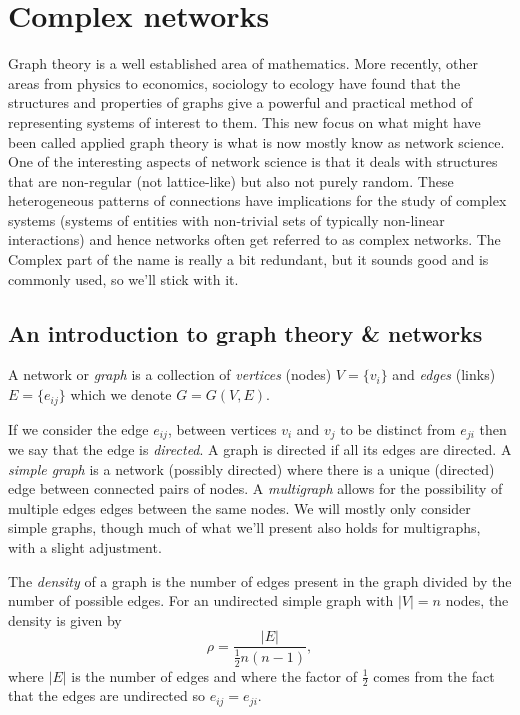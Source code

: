 \section{Complex networks}

Graph theory is a well established area of mathematics. More recently, other areas from physics to economics, sociology to ecology have found that the structures and properties of graphs give a powerful and practical method of representing systems of interest to them. This new focus on what might have been called applied graph theory is what is now mostly know as network science. One of the interesting aspects of network science is that it deals with structures that are non-regular (not lattice-like) but also not purely random. These heterogeneous patterns of connections have implications for the study of complex systems (systems of entities with non-trivial sets of typically non-linear interactions) and hence networks often get referred to as complex networks. The Complex part of the name is really a bit redundant, but it sounds good and is commonly used, so we'll stick with it.

\subsection{An introduction to graph theory \& networks}

A network or \emph{graph} is a collection of \emph{vertices} (nodes) $V=\{v_i\}$ and \emph{edges} (links) $E=\{e_{ij}\}$ which we denote $G= G(V,E)$.

If we consider the edge $e_{ij}$, between vertices $v_i$ and $v_j$ to be distinct from $e_{ji}$ then we say that the edge is \emph{directed}. A graph is directed if all its edges are directed. A \emph{simple graph} is a network (possibly directed) where there is a unique (directed) edge between connected pairs of nodes. A \emph{multigraph} allows for the possibility of multiple edges edges between the same nodes. We will mostly only consider simple graphs, though much of what we'll present also holds for multigraphs, with a slight adjustment. 

The \emph{density} of a graph is the number of edges present in the graph divided by the number of possible edges. For an undirected simple graph with $|V|=n$ nodes, the density is given by
$$
	\rho = \frac{|E|}{\frac12 n(n-1)},
$$
where $|E|$ is the number of edges and where the factor of $\frac12$ comes from the fact that the edges are undirected so $e_{ij}=e_{ji}$. 

